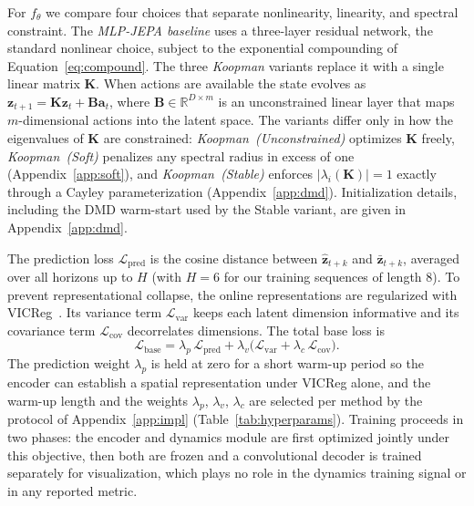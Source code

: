 \documentclass[10pt]{article} %
\newcommand{\K}{\mathbf{K}}
\newcommand{\B}{\mathbf{B}}
\newcommand{\z}{\bm{z}}
\begin{document}
For $f_\theta$ we compare four choices that separate nonlinearity, linearity, and spectral constraint. The \emph{MLP-JEPA baseline} uses a three-layer residual network, the standard nonlinear choice, subject to the exponential compounding of Equation~\ref{eq:compound}. The three \emph{Koopman} variants replace it with a single linear matrix $\K$. When actions are available the state evolves as $\z_{t+1} = \K\z_t + \B\mathbf{a}_t$, where $\B \in \mathbb{R}^{D \times m}$ is an unconstrained linear layer that maps $m$-dimensional actions into the latent space. The variants differ only in how the eigenvalues of $\K$ are constrained: \emph{Koopman~(Unconstrained)} optimizes $\K$ freely, \emph{Koopman~(Soft)} penalizes any spectral radius in excess of one (Appendix~\ref{app:soft}), and \emph{Koopman~(Stable)} enforces $|\lambda_i(\K)| = 1$ exactly through a Cayley parameterization (Appendix~\ref{app:dmd}). Initialization details, including the DMD warm-start used by the Stable variant, are given in Appendix~\ref{app:dmd}.

The prediction loss $\mathcal{L}_\text{pred}$ is the cosine distance between $\hat{\z}_{t+k}$ and $\bar{\z}_{t+k}$, averaged over all horizons up to $H$ (with $H{=}6$ for our training sequences of length 8). To prevent representational collapse, the online representations are regularized with VICReg~\citep{Bardes2022}. Its variance term $\mathcal{L}_\text{var}$ keeps each latent dimension informative and its covariance term $\mathcal{L}_\text{cov}$ decorrelates dimensions. The total base loss is
\begin{equation}
    \mathcal{L}_\text{base} = \lambda_p\,\mathcal{L}_\text{pred} + \lambda_v\bigl(\mathcal{L}_\text{var} + \lambda_c\,\mathcal{L}_\text{cov}\bigr).
    \label{eq:base_loss}
\end{equation}
The prediction weight $\lambda_p$ is held at zero for a short warm-up period so the encoder can establish a spatial representation under VICReg alone, and the warm-up length and the weights $\lambda_p$, $\lambda_v$, $\lambda_c$ are selected per method by the protocol of Appendix~\ref{app:impl} (Table~\ref{tab:hyperparams}). Training proceeds in two phases: the encoder and dynamics module are first optimized jointly under this objective, then both are frozen and a convolutional decoder is trained separately for visualization, which plays no role in the dynamics training signal or in any reported metric.
\end{document}
